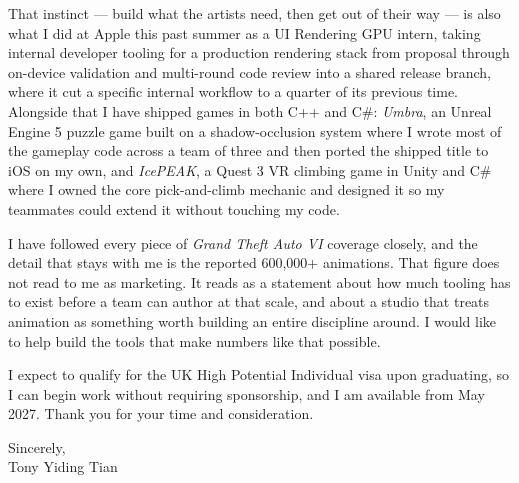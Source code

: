 \documentclass[letterpaper,11pt]{article}
\begin{document}
That instinct --- build what the artists need, then get out of their way --- is also what I did at Apple this past summer as a UI Rendering GPU intern, taking internal developer tooling for a production rendering stack from proposal through on-device validation and multi-round code review into a shared release branch, where it cut a specific internal workflow to a quarter of its previous time. Alongside that I have shipped games in both C++ and C\#: \emph{Umbra}, an Unreal Engine 5 puzzle game built on a shadow-occlusion system where I wrote most of the gameplay code across a team of three and then ported the shipped title to iOS on my own, and \emph{IcePEAK}, a Quest 3 VR climbing game in Unity and C\# where I owned the core pick-and-climb mechanic and designed it so my teammates could extend it without touching my code.

I have followed every piece of \emph{Grand Theft Auto VI} coverage closely, and the detail that stays with me is the reported 600,000+ animations. That figure does not read to me as marketing. It reads as a statement about how much tooling has to exist before a team can author at that scale, and about a studio that treats animation as something worth building an entire discipline around. I would like to help build the tools that make numbers like that possible.

I expect to qualify for the UK High Potential Individual visa upon graduating, so I can begin work without requiring sponsorship, and I am available from May 2027. Thank you for your time and consideration.

\vspace{1em}

Sincerely, \\
\vspace{0.5em}
Tony Yiding Tian
\end{document}
